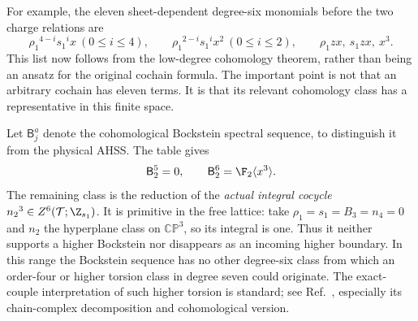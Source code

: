 For example, the eleven sheet-dependent degree-six monomials before the two charge relations are
\begin{equation}
 {\rho_1}^{4-i}{s_1}^ix\ (0\leq i\leq4),\qquad
 {\rho_1}^{2-i}{s_1}^ix^2\ (0\leq i\leq2),\qquad
 {\rho_1}zx,\ {s_1}zx,\ x^3.
\end{equation}
This list now follows from the low-degree cohomology theorem, rather than being an ansatz for the original cochain formula. The important point is not that an arbitrary cochain has eleven terms. It is that its relevant cohomology class has a representative in this finite space.

Let $\mathsf B_j^a$ denote the cohomological Bockstein spectral sequence, to distinguish it from the physical AHSS. The table gives
\begin{equation}\label{eq:Bss05}
 \mathsf B_2^5=0,\qquad
 \mathsf B_2^6=\F_2\langle x^3\rangle.
\end{equation}
The remaining class is the reduction of the \emph{actual integral cocycle} ${n_2}^3\in Z^6(\mathcal T;\Z_{s_1})$. It is primitive in the free lattice: take ${\rho_1}={s_1}={B_3}={n_4}=0$ and ${n_2}$ the hyperplane class on $\mathbb{CP}^3$, so its integral is one. Thus it neither supports a higher Bockstein nor disappears as an incoming higher boundary. In this range the Bockstein sequence has no other degree-six class from which an order-four or higher torsion class in degree seven could originate. The exact-couple interpretation of such higher torsion is standard; see Ref.~\cite{McClearyBSS}, especially its chain-complex decomposition and cohomological version.

